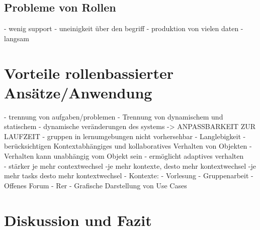 \documentclass[conference]{IEEEtran}
\begin{document}
\subsection{Probleme von Rollen}
- wenig support
- uneinigkeit über den begriff 
- produktion von vielen daten
- langsam \cite{bachman}

\section{Vorteile rollenbassierter Ansätze/Anwendung}
- trennung von aufgaben/problemen
- Trennung von dynamischem und statischem
- dynamische veränderungen des systems -> ANPASSBARKEIT ZUR LAUFZEIT
	- gruppen in lernumgebungen nicht vorhersehbar
- Langlebigkeit
- berücksichtigen Kontextabhängiges und kollaboratives Verhalten von Objekten \cite{family}
- Verhalten kann unabhängig vom Objekt sein - ermöglicht adaptives verhalten\\
- stärker je mehr contextwechsel
	-je mehr kontexte, desto mehr kontextwechsel
		-je mehr tasks desto mehr kontextwechsel
- Kontexte:
	- Vorlesung
	- Gruppenarbeit
	- Offenes Forum
	- Rer
- Grafische Darstellung von Use Cases




\section{Diskussion und Fazit}

{}

\end{document}
